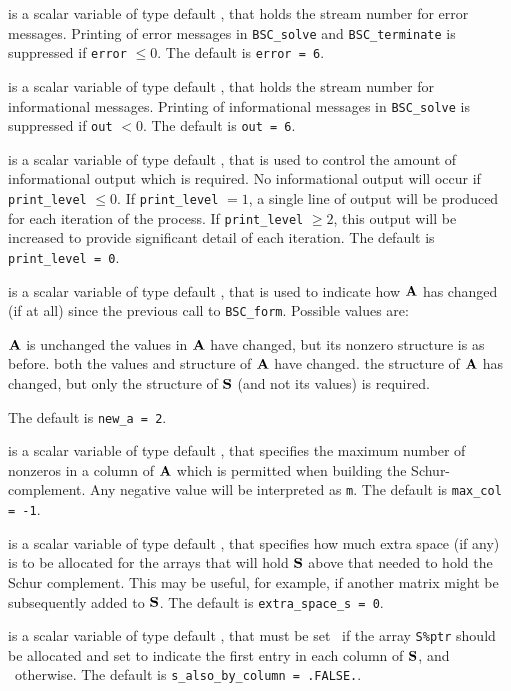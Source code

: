 \documentclass{galahad}
\newcommand{\packagename}{BSC}
\begin{document}
\begin{description}

 is a scalar variable of type default \integer, that holds the
stream number for error messages. Printing of error messages in 
{\tt \packagename\_solve} and {\tt \packagename\_terminate} 
is suppressed if {\tt error} $\leq 0$.
The default is {\tt error = 6}.

 is a scalar variable of type default \integer, that holds the
stream number for informational messages. Printing of informational messages in 
{\tt \packagename\_solve} is suppressed if {\tt out} $< 0$.
The default is {\tt out = 6}.

 is a scalar variable of type default \integer, that is used
to control the amount of informational output which is required. No 
informational output will occur if {\tt print\_level} $\leq 0$. If 
{\tt print\_level} $= 1$, a single line of output will be produced for each
iteration of the process. If {\tt print\_level} $\geq 2$, this output will be
increased to provide significant detail of each iteration.
The default is {\tt print\_level = 0}.

 is a scalar variable of type default \integer, that is used
to indicate how ${\mathbf{A}}$ has changed (if at all) since the previous call
to {\tt BSC\_form}. Possible values are:
\begin{description}
 ${\mathbf{A}}$ is unchanged
 the values in ${\mathbf{A}}$ have changed, but its nonzero structure 
is as before.
 both the values and structure of ${\mathbf{A}}$ have changed.
 the structure of ${\mathbf{A}}$ has changed, but only the structure of
${\mathbf{S}}$ (and not its values) is required.
\end{description}
The default is {\tt new\_a = 2}.

 is a scalar variable of type default \integer, that specifies
the maximum number of nonzeros in a column of ${\mathbf{A}}$ which is permitted
when building the Schur-complement. Any negative value will be interpreted
as {\tt m}.
The default is {\tt max\_col = -1}.

 is a scalar variable of type default \integer, 
that specifies how much extra space (if any) is to be allocated for the arrays 
that will hold ${\mathbf{S}}$ above that needed to hold the Schur complement.
This may be useful, for example, if another matrix might be subsequently added
to ${\mathbf{S}}$.
The default is {\tt extra\_space\_s = 0}.

 is a scalar variable of type default \logical, 
that must be set \true\ if the array {\tt S\%ptr} should be allocated and set 
to indicate the first entry in each column of ${\mathbf{S}}$, and  \false\ otherwise. 
The default is {\tt s\_also\_by\_column = .FALSE.}.


\end{description}
\end{document}
